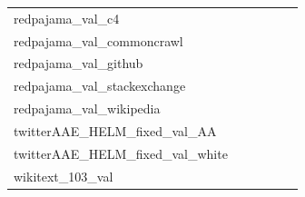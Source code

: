 \documentclass[dvipsnames]{article}
\begin{document}
\begin{appendix}
{\begin{longtable}{m{6cm}m{1.7cm}m{1.7cm}m{1.7cm}m{1.7cm}m{1.7cm}}
	redpajama\_val\_c4  & \colorbox[HTML]{fefee3}{\makebox[\mywidth][c]{13.01}} & \colorbox[HTML]{e9f6af}{\makebox[\mywidth][c]{12.51}} & \colorbox[HTML]{ffffe5}{\makebox[\mywidth][c]{13.55}} & \colorbox[HTML]{e5f4ab}{\makebox[\mywidth][c]{12.49}} & \colorbox[HTML]{77c578}{\makebox[\mywidth][c]{12.27}}\\
	redpajama\_val\_commoncrawl  & \colorbox[HTML]{fcfed8}{\makebox[\mywidth][c]{10.90}} & \colorbox[HTML]{e2f3a9}{\makebox[\mywidth][c]{10.56}} & \colorbox[HTML]{ffffe5}{\makebox[\mywidth][c]{11.70}} & \colorbox[HTML]{d8efa2}{\makebox[\mywidth][c]{10.52}} & \colorbox[HTML]{77c578}{\makebox[\mywidth][c]{10.35}}\\
	redpajama\_val\_github  & \colorbox[HTML]{e5f4ab}{\makebox[\mywidth][c]{1.66}} & \colorbox[HTML]{eff8b3}{\makebox[\mywidth][c]{1.66}} & \colorbox[HTML]{ffffe5}{\makebox[\mywidth][c]{1.75}} & \colorbox[HTML]{d3eda0}{\makebox[\mywidth][c]{1.65}} & \colorbox[HTML]{77c578}{\makebox[\mywidth][c]{1.64}}\\
	redpajama\_val\_stackexchange  & \colorbox[HTML]{f6fbb8}{\makebox[\mywidth][c]{3.73}} & \colorbox[HTML]{eff8b3}{\makebox[\mywidth][c]{3.72}} & \colorbox[HTML]{ffffe5}{\makebox[\mywidth][c]{4.03}} & \colorbox[HTML]{d1ec9f}{\makebox[\mywidth][c]{3.68}} & \colorbox[HTML]{77c578}{\makebox[\mywidth][c]{3.63}}\\
	redpajama\_val\_wikipedia  & \colorbox[HTML]{ffffe5}{\makebox[\mywidth][c]{4.64}} & \colorbox[HTML]{f5fbb7}{\makebox[\mywidth][c]{4.38}} & \colorbox[HTML]{ffffe5}{\makebox[\mywidth][c]{4.68}} & \colorbox[HTML]{e2f3a9}{\makebox[\mywidth][c]{4.35}} & \colorbox[HTML]{77c578}{\makebox[\mywidth][c]{4.29}}\\
	twitterAAE\_HELM\_fixed\_val\_AA  & \colorbox[HTML]{ffffe5}{\makebox[\mywidth][c]{346.98}} & \colorbox[HTML]{f4fab6}{\makebox[\mywidth][c]{302.79}} & \colorbox[HTML]{fbfdd1}{\makebox[\mywidth][c]{310.30}} & \colorbox[HTML]{eff8b3}{\makebox[\mywidth][c]{301.65}} & \colorbox[HTML]{77c578}{\makebox[\mywidth][c]{289.97}}\\
	twitterAAE\_HELM\_fixed\_val\_white  & \colorbox[HTML]{ffffe5}{\makebox[\mywidth][c]{118.62}} & \colorbox[HTML]{e4f4ab}{\makebox[\mywidth][c]{107.34}} & \colorbox[HTML]{f9fcc6}{\makebox[\mywidth][c]{109.13}} & \colorbox[HTML]{eaf7af}{\makebox[\mywidth][c]{107.65}} & \colorbox[HTML]{77c578}{\makebox[\mywidth][c]{105.13}}\\
	wikitext\_103\_val  & \colorbox[HTML]{e7f5ad}{\makebox[\mywidth][c]{11.74}} & \colorbox[HTML]{eaf7af}{\makebox[\mywidth][c]{11.76}} & \colorbox[HTML]{ffffe5}{\makebox[\mywidth][c]{13.73}} & \colorbox[HTML]{77c578}{\makebox[\mywidth][c]{11.32}} & \colorbox[HTML]{9dd687}{\makebox[\mywidth][c]{11.41}}\\
\end{longtable}
}
\end{appendix}
\end{document}
